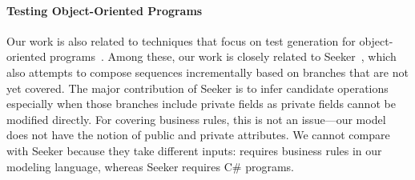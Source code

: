 \paragraph*{Testing Object-Oriented Programs} Our work is also related to
techniques that focus on test generation for object-oriented
programs~\cite{pacheco2007,tillmann2008,thummalapenta2011, tonella:etoc}.
Among these, our work is closely related to Seeker~\cite{thummalapenta2011},
which also attempts to compose sequences incrementally based on branches that
are not yet covered. The major contribution of Seeker is to infer candidate
operations especially when those branches include private fields as private
fields cannot be modified directly. For covering business rules, this is not an
issue---our model does not have the notion of public and private attributes. We
cannot compare \tool{} with Seeker because they take different inputs: \tool{}
requires business rules in our modeling language, whereas Seeker requires C\#
programs.

